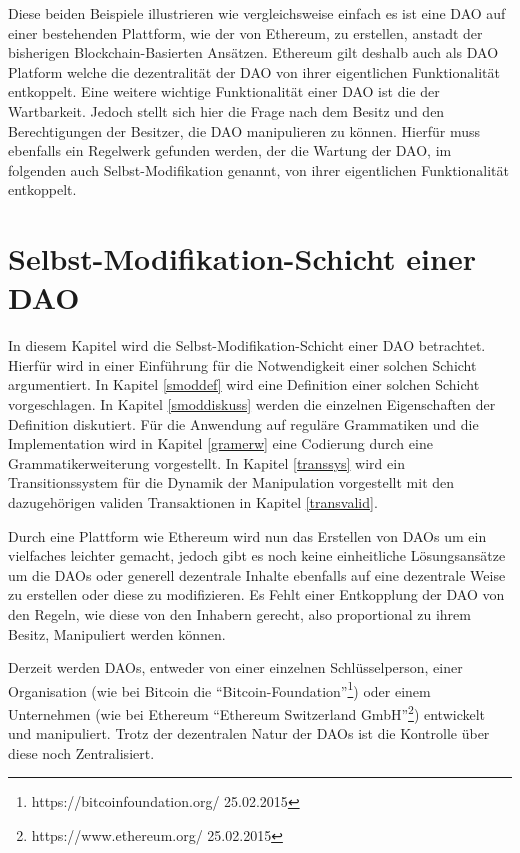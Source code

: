 \documentclass[a4paper,12pt]{report}
\begin{document}
Diese beiden Beispiele illustrieren wie vergleichsweise einfach es ist eine DAO auf einer bestehenden Plattform, wie der von Ethereum, zu erstellen, anstadt der bisherigen Blockchain-Basierten Ansätzen. Ethereum gilt deshalb auch als DAO Platform welche die dezentralität der DAO von ihrer eigentlichen Funktionalität entkoppelt. Eine weitere wichtige Funktionalität einer DAO ist die der Wartbarkeit. Jedoch stellt sich hier die Frage nach dem Besitz und den Berechtigungen der Besitzer, die DAO manipulieren zu können. Hierfür muss ebenfalls ein Regelwerk gefunden werden, der die Wartung der DAO, im folgenden auch Selbst-Modifikation genannt, von ihrer eigentlichen Funktionalität entkoppelt. 



\chapter{Selbst-Modifikation-Schicht einer DAO}
\label{selfMod}
In diesem Kapitel wird die Selbst-Modifikation-Schicht einer DAO betrachtet. Hierfür wird in einer Einführung für die Notwendigkeit einer solchen Schicht argumentiert. In Kapitel \ref{smoddef} wird eine Definition einer solchen Schicht vorgeschlagen. In Kapitel \ref{smoddiskuss} werden die einzelnen Eigenschaften der Definition diskutiert. Für die Anwendung auf reguläre Grammatiken und die Implementation wird in Kapitel \ref{gramerw} eine Codierung durch eine Grammatikerweiterung vorgestellt. In Kapitel \ref{transsys} wird ein Transitionssystem für die Dynamik der Manipulation vorgestellt mit den dazugehörigen validen Transaktionen in Kapitel \ref{transvalid}.

Durch eine Plattform wie Ethereum wird nun das Erstellen von DAOs um ein vielfaches leichter gemacht, jedoch gibt es noch keine einheitliche Lösungsansätze um die DAOs oder generell dezentrale Inhalte ebenfalls auf eine dezentrale Weise zu erstellen oder diese zu modifizieren. Es Fehlt einer Entkopplung der DAO von den Regeln, wie diese von den Inhabern gerecht, also proportional zu ihrem Besitz, Manipuliert werden können.

Derzeit werden DAOs, entweder von einer einzelnen Schlüsselperson, einer Organisation (wie bei Bitcoin die ``Bitcoin-Foundation''\footnote{https://bitcoinfoundation.org/ 25.02.2015}) oder einem Unternehmen (wie bei Ethereum ``Ethereum Switzerland GmbH''\footnote{https://www.ethereum.org/ 25.02.2015}) entwickelt und manipuliert. Trotz der dezentralen Natur der DAOs ist die Kontrolle über diese noch Zentralisiert. 
\end{document}
